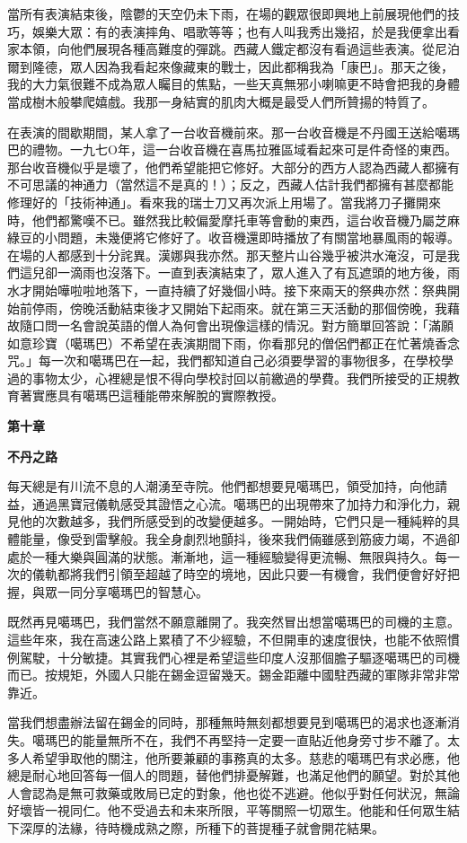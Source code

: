 當所有表演結束後，陰鬱的天空仍未下雨，在場的觀眾很即興地上前展現他們的技巧，娛樂大眾：有的表演摔角、唱歌等等；也有人叫我秀出幾招，於是我便拿出看家本領，向他們展現各種高難度的彈跳。西藏人鐵定都沒有看過這些表演。從尼泊爾到隆德，眾人因為我看起來像藏東的戰士，因此都稱我為「康巴」。那天之後，我的大力氣很難不成為眾人矚目的焦點，一些天真無邪小喇嘛更不時會把我的身體當成樹木般攀爬嬉戲。我那一身結實的肌肉大概是最受人們所贊揚的特質了。

在表演的間歇期間，某人拿了一台收音機前來。那一台收音機是不丹國王送給噶瑪巴的禮物。一九七Ο年，這一台收音機在喜馬拉雅區域看起來可是件奇怪的東西。那台收音機似乎是壞了，他們希望能把它修好。大部分的西方人認為西藏人都擁有不可思議的神通力（當然這不是真的！）；反之，西藏人估計我們都擁有甚麼都能修理好的「技術神通」。看來我的瑞士刀又再次派上用場了。當我將刀子攤開來時，他們都驚嘆不已。雖然我比較偏愛摩托車等會動的東西，這台收音機乃屬芝麻綠豆的小問題，未幾便將它修好了。收音機還即時播放了有關當地暴風雨的報導。在場的人都感到十分詫異。漢娜與我亦然。那天整片山谷幾乎被洪水淹沒，可是我們這兒卻一滴雨也沒落下。一直到表演結束了，眾人進入了有瓦遮頭的地方後，雨水才開始嘩啦啦地落下，一直持續了好幾個小時。接下來兩天的祭典亦然：祭典開始前停雨，傍晚活動結束後才又開始下起雨來。就在第三天活動的那個傍晚，我藉故隨口問一名會說英語的僧人為何會出現像這樣的情況。對方簡單回答說：「滿願如意珍寶（噶瑪巴）不希望在表演期間下雨，你看那兒的僧侶們都正在忙著燒香念咒。」每一次和噶瑪巴在一起，我們都知道自己必須要學習的事物很多，在學校學過的事物太少，心裡總是恨不得向學校討回以前繳過的學費。我們所接受的正規教育著實應具有噶瑪巴這種能帶來解脫的實際教授。

\textbf{第十章}

\textbf{不丹之路}

每天總是有川流不息的人潮湧至寺院。他們都想要見噶瑪巴，領受加持，向他請益，通過黑寶冠儀軌感受其證悟之心流。噶瑪巴的出現帶來了加持力和淨化力，親見他的次數越多，我們所感受到的改變便越多。一開始時，它們只是一種純粹的具體能量，像受到雷擊般。我全身劇烈地顫抖，後來我們倆雖感到筋疲力竭，不過卻處於一種大樂與圓滿的狀態。漸漸地，這一種經驗變得更流暢、無限與持久。每一次的儀軌都將我們引領至超越了時空的境地，因此只要一有機會，我們便會好好把握，與眾一同分享噶瑪巴的智慧心。

既然再見噶瑪巴，我們當然不願意離開了。我突然冒出想當噶瑪巴的司機的主意。這些年來，我在高速公路上累積了不少經驗，不但開車的速度很快，也能不依照慣例駕駛，十分敏捷。其實我們心裡是希望這些印度人沒那個膽子驅逐噶瑪巴的司機而已。按規矩，外國人只能在錫金逗留幾天。錫金距離中國駐西藏的軍隊非常非常靠近。

當我們想盡辦法留在錫金的同時，那種無時無刻都想要見到噶瑪巴的渴求也逐漸消失。噶瑪巴的能量無所不在，我們不再堅持一定要一直貼近他身旁寸步不離了。太多人希望爭取他的關注，他所要兼顧的事務真的太多。慈悲的噶瑪巴有求必應，他總是耐心地回答每一個人的問題，替他們排憂解難，也滿足他們的願望。對於其他人會認為是無可救藥或敗局已定的對象，他也從不逃避。他似乎對任何狀況，無論好壞皆一視同仁。他不受過去和未來所限，平等關照一切眾生。他能和任何眾生結下深厚的法緣，待時機成熟之際，所種下的菩提種子就會開花結果。

